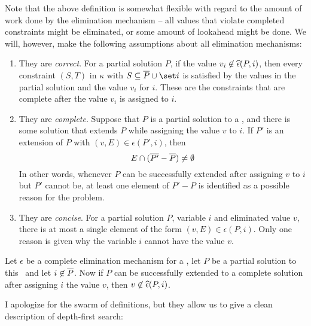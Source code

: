 Note that the above definition is somewhat flexible with regard to the
amount of work done by the elimination mechanism -- all values that
violate completed constraints might be eliminated, or some amount of
lookahead might be done.  We will, however, make the following
assumptions about all elimination mechanisms:
 \begin{enumerate}
 \item They are {\em correct}.  For a partial solution $P$, if the
value $v_i\not\in\widehat\epsilon(P,i)$, then every constraint $(S,T)$ in
$\kappa$ with $S\subseteq \Pbar\cup \set i$ is satisfied by the values
in the partial solution and the value $v_i$ for $i$.  These are the
constraints that are complete after the value $v_i$ is assigned to
$i$.
 \item They are {\em complete}.  Suppose that $P$ is a partial
solution to a \csp, and there is some solution that extends $P$ while
assigning the value $v$ to $i$.  If $P'$ is an extension of $P$ with
$(v,E)\in\epsilon(P',i)$, then
 \begin{equation}
E\cap(\overline{P'}-\overline P) \neq\emptyset
 \end{equation}
 In other words, whenever $P$ can be successfully extended after
assigning $v$ to $i$ but $P'$ cannot be, at least one element of
$P'-P$ is identified as a possible reason for the problem.
 \item They are {\em concise}.  For a partial solution $P$, variable
$i$ and eliminated value $v$, there is at most a single element of the
form $(v,E)\in \epsilon(P,i)$.  Only one reason is given why the
variable $i$ cannot have the value $v$.
 \end{enumerate}

\begin{lemma} Let $\epsilon$ be a complete elimination mechanism for a
\csp, let $P$ be a partial solution to this \csp\ and let $i\not\in
\overline P$.  Now if $P$ can be successfully extended to a complete
solution after assigning $i$ the value $v$, then
$v\not\in\widehat\epsilon(P,i)$.
 \label{old.1}
 \label{l.eliminate}
 \end{lemma}

I apologize for the swarm of definitions, but they allow us to give a
clean description of depth-first search:

